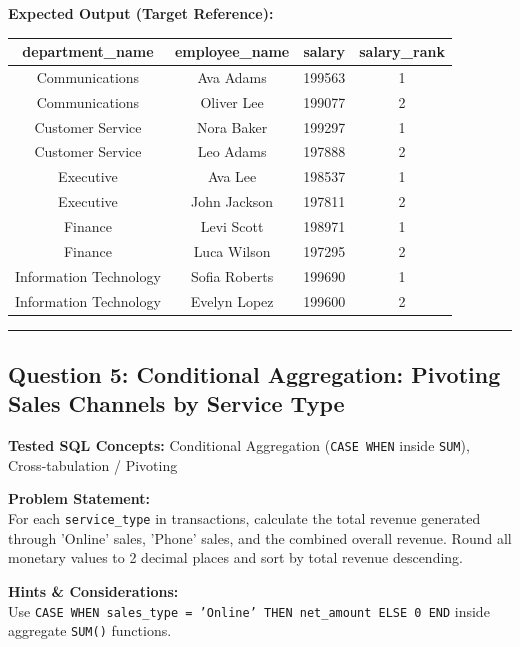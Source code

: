 \documentclass[11pt,a4paper]{article}
\begin{document}
\vspace{0.3cm}
\noindent\textbf{Expected Output (Target Reference):}
\begin{center}
\small
\begin{tabular}{cccc}
\toprule
\textbf{department\_name} & \textbf{employee\_name} & \textbf{salary} & \textbf{salary\_rank} \\
\midrule
Communications & Ava Adams & 199563 & 1 \\
Communications & Oliver Lee & 199077 & 2 \\
Customer Service & Nora Baker & 199297 & 1 \\
Customer Service & Leo Adams & 197888 & 2 \\
Executive & Ava Lee & 198537 & 1 \\
Executive & John Jackson & 197811 & 2 \\
Finance & Levi Scott & 198971 & 1 \\
Finance & Luca Wilson & 197295 & 2 \\
Information Technology & Sofia Roberts & 199690 & 1 \\
Information Technology & Evelyn Lopez & 199600 & 2 \\
\bottomrule
\end{tabular}
\end{center}

\vspace{0.4cm}
\noindent\rule{\textwidth}{0.4pt}
\vspace{0.4cm}

\subsection*{Question 5: Conditional Aggregation: Pivoting Sales Channels by Service Type}

\noindent\textbf{Tested SQL Concepts:} Conditional Aggregation (\texttt{CASE WHEN} inside \texttt{SUM}), Cross-tabulation / Pivoting

\vspace{0.15cm}
\noindent\textbf{Problem Statement:} \\
For each \texttt{service\_type} in transactions, calculate the total revenue generated through 'Online' sales, 'Phone' sales, and the combined overall revenue. Round all monetary values to 2 decimal places and sort by total revenue descending.

\vspace{0.2cm}
\noindent\textbf{Hints \& Considerations:} \\
Use \texttt{CASE WHEN sales\_type = 'Online' THEN net\_amount ELSE 0 END} inside aggregate \texttt{SUM()} functions.
\end{document}
